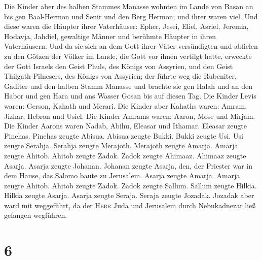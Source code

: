  Die Kinder aber des halben Stammes Manasse wohnten im
Lande von Basan an bis gen Baal-Hermon und Senir und den Berg Hermon;
und ihrer waren viel.  Und diese waren die Häupter ihrer
Vaterhäuser: Epher, Jesei, Eliel, Asriel, Jeremia, Hodavja, Jahdiel,
gewaltige Männer und berühmte Häupter in ihren Vaterhäusern.
 Und da sie sich an dem Gott ihrer Väter versündigten und
abfielen zu den Götzen der Völker im Lande, die Gott vor ihnen vertilgt
hatte,  erweckte der Gott Israels den Geist Phuls, des
Königs von Assyrien, und den Geist Thilgath-Pilnesers, des Königs von
Assyrien; der führte weg die Rubeniter, Gaditer und den halben Stamm
Manasse und brachte sie gen Halah und an den Habor und gen Hara und ans
Wasser Gosan bis auf diesen Tag.  Die Kinder Levis waren:
Gerson, Kahath und Merari.  Die Kinder aber Kahaths
waren: Amram, Jizhar, Hebron und Usiel.  Die Kinder
Amrams waren: Aaron, Mose und Mirjam. Die Kinder Aarons waren Nadab,
Abihu, Eleasar und Ithamar.  Eleasar zeugte Pinehas.
Pinehas zeugte Abisua.  Abisua zeugte Bukki. Bukki zeugte
Usi.  Usi zeugte Serahja. Serahja zeugte Merajoth.
 Merajoth zeugte Amarja. Amarja zeugte Ahitob.
 Ahitob zeugte Zadok. Zadok zeugte Ahimaaz.
 Ahimaaz zeugte Asarja. Asarja zeugte Johanan.
 Johanan zeugte Asarja, den, der Priester war in dem
Hause, das Salomo baute zu Jerusalem.  Asarja zeugte
Amarja. Amarja zeugte Ahitob.  Ahitob zeugte Zadok. Zadok
zeugte Sallum.  Sallum zeugte Hilkia. Hilkia zeugte
Asarja.  Asarja zeugte Seraja. Seraja zeugte Jozadak.
 Jozadak aber ward mit weggeführt, da der \textsc{Herr}
Juda und Jerusalem durch Nebukadnezar ließ gefangen wegführen.

\hypertarget{section-5}{%
\section{6}\label{section-5}}

